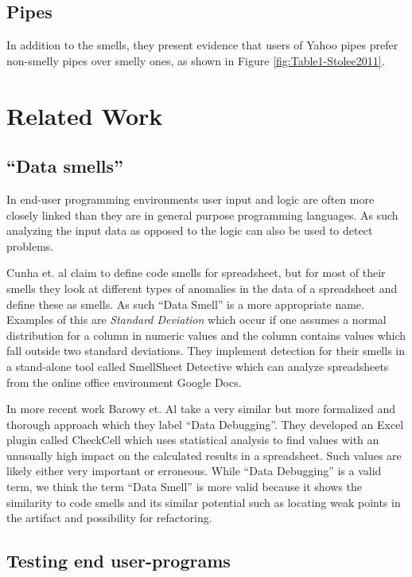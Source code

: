 \documentclass[10pt,conference,compsocconf]{IEEEtran}
\begin{document}
\subsection{Pipes}

In addition to the smells, they present evidence that users of Yahoo pipes prefer non-smelly pipes over smelly ones, as shown in Figure \ref{fig:Table1-Stolee2011}.


\section{Related Work}
\label{sec:related_work}

\subsection{``Data smells''}
\label{subsec:related_datasmells}

In end-user programming environments user input and logic are often more closely linked than they are in general purpose programming languages.
As such analyzing the input data as opposed to the logic can also be used to detect problems.

Cunha et. al \cite{cunha2012towards} claim to define code smells for spreadsheet, but for most of their smells they look at different types of anomalies in the data of a spreadsheet and define these as smells.
As such ``Data Smell'' is a more appropriate name.
Examples of this are \textit{Standard Deviation} which occur if one assumes a normal distribution for a column in numeric values and the column contains values which fall outside two standard deviations.
They implement detection for their smells in a stand-alone tool called SmellSheet Detective which can analyze spreadsheets from the online office environment Google Docs.

In more recent work Barowy et. Al \cite{barowy2014checkcell} take a very similar but more formalized and thorough approach which they label ``Data Debugging''.
They developed an Excel plugin called CheckCell which uses statistical analysis to find values with an unusually high impact on the calculated results in a spreadsheet.
Such values are likely either very important or erroneous.
While ``Data Debugging'' is a valid term, we think the term ``Data Smell'' is more valid because it shows the similarity to code smells and its similar potential such as locating weak points in the artifact and possibility for refactoring.

\subsection{Testing end user-programs}
\end{document}
